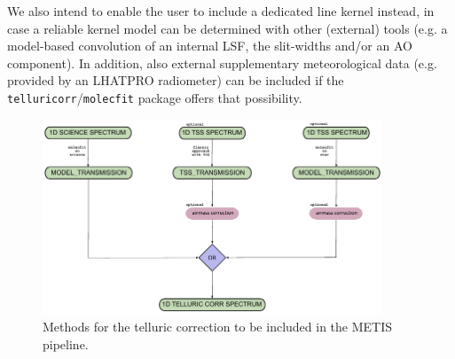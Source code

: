 We also intend to enable the user to include a dedicated line kernel instead, in case a reliable kernel model can be determined with other (external) tools (e.g. a model-based convolution of an internal \ac{LSF}, the slit-widths and/or an \ac{AO} component). In addition, also external supplementary meteorological data (e.g. provided by an \ac{LHATPRO} radiometer) can be included if the \texttt{telluricorr}/\texttt{molecfit} package offers that possibility.
\begin{figure}[ht]
  \centering
  \includegraphics[width=0.9\textwidth]{figures/tell_corr_methods.pdf}
  \caption{Methods for the telluric correction to be included in the \ac{METIS} pipeline.}
  \label{Fig:tellcorrmethods}
\end{figure}
